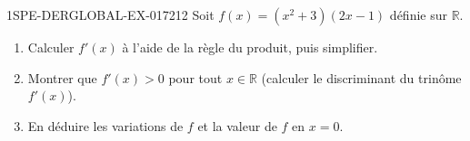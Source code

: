 \begin{exercice}{1SPE-DERGLOBAL-EX-017}{2}{12}
Soit $f(x) = (x^2+3)(2x-1)$ définie sur $\mathbb{R}$.
\begin{enumerate}
  \item Calculer $f'(x)$ à l'aide de la règle du produit, puis simplifier.
  \item Montrer que $f'(x) > 0$ pour tout $x \in \mathbb{R}$ (calculer le discriminant du trinôme $f'(x)$).
  \item En déduire les variations de $f$ et la valeur de $f$ en $x=0$.
\end{enumerate}
\end{exercice}
